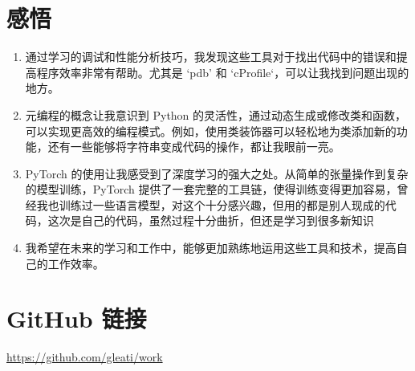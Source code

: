 \documentclass{ctexart}
\begin{document}
\section{感悟}
\begin{enumerate}
    \item 
通过学习的调试和性能分析技巧，我发现这些工具对于找出代码中的错误和提高程序效率非常有帮助。尤其是 ‘pdb’ 和 `cProfile`，可以让我找到问题出现的地方。
    \item 
元编程的概念让我意识到 Python 的灵活性，通过动态生成或修改类和函数，可以实现更高效的编程模式。例如，使用类装饰器可以轻松地为类添加新的功能，还有一些能够将字符串变成代码的操作，都让我眼前一亮。
    \item 
PyTorch 的使用让我感受到了深度学习的强大之处。从简单的张量操作到复杂的模型训练，PyTorch 提供了一套完整的工具链，使得训练变得更加容易，曾经我也训练过一些语言模型，对这个十分感兴趣，但用的都是别人现成的代码，这次是自己的代码，虽然过程十分曲折，但还是学习到很多新知识
    \item 
我希望在未来的学习和工作中，能够更加熟练地运用这些工具和技术，提高自己的工作效率。
\end{enumerate}

\section{GitHub 链接}
\url{https://github.com/gleati/work} 
\end{document}

